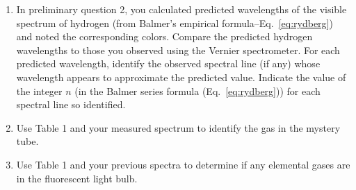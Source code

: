 \documentclass{article}
\begin{document}
\begin{enumerate}
\item In preliminary question 2, you calculated predicted wavelengths of
the visible spectrum of hydrogen (from Balmer's
empirical formula--Eq.~\ref{eq:rydberg}) and noted the corresponding colors.
Compare the predicted hydrogen wavelengths to those you observed
using the Vernier spectrometer.  For each predicted
wavelength, identify the observed spectral line (if any) whose
wavelength appears to approximate the predicted value.  Indicate the
value of the integer $n$ (in the Balmer series formula (Eq.~\ref{eq:rydberg})) for each
spectral line so identified.

\item Use Table 1 and your measured spectrum to identify the gas in the mystery tube.   

\item Use Table 1 and your previous spectra to determine if any elemental gases are in the fluorescent light bulb. 

\end{enumerate}
\end{document}
